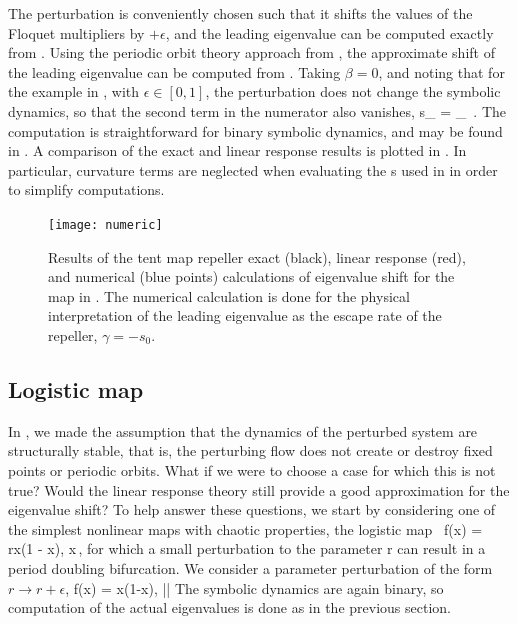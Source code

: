 \documentclass[aps,pre,
                showpacs,
                twocolumn,
                groupedaddress,
                superscriptaddress,
                floatfix]{revtex4-1}
\begin{document}
The perturbation is
conveniently chosen such that it shifts the values of the Floquet
multipliers by $+\epsilon$, and the leading eigenvalue can be computed
exactly from . Using the periodic orbit theory approach from
, the approximate shift of the leading
eigenvalue can be computed from . Taking $\beta=0$,
and noting that for the example in , with
$\epsilon\in [0,1]$, the perturbation does not change the symbolic
dynamics, so that the second term in the numerator also vanishes,
\beq
\delta s_{\alpha}
  = 
    _{\zeta}
\,.
\eeq
The computation is straightforward for binary symbolic dynamics, and may
be found in . A comparison of the exact
and linear response results is plotted in . In
particular, curvature terms are neglected when evaluating the {\cycForm
s} used in  in order to simplify computations.

\begin{figure}[htbp]
\texttt{[image: numeric]}
    \caption{\label{fig:numeric}
Results of the tent map repeller exact (black), linear response (red),
and numerical (blue points) calculations of eigenvalue shift for the map
in .
The numerical calculation is done for
the physical interpretation of the leading eigenvalue as the escape rate
of the repeller, $\gamma = -s_{0}$.
    }
\end{figure}

\subsection{Logistic map}
\label{sect:logstMap}

In , we made the assumption that the dynamics of the
perturbed system are structurally stable, that is, the perturbing flow
does not create or destroy fixed points or periodic orbits. What if we
were to choose a case for which this is not true? Would the linear
response theory still provide a good approximation for the eigenvalue
shift? To help answer these questions, we start by considering one of the
simplest nonlinear maps with chaotic properties, the logistic map\
\beq
f(x) = rx(1 - x), x\in [0, 1]
\,,
for which a small perturbation to the parameter r can result in a period
doubling bifurcation. We consider a parameter perturbation of the form
$r \to r+\epsilon$,
\beq
\epsilon \delta f(x) = \epsilon x(1-x), |\epsilon|
\eeq
The symbolic dynamics are again binary, so computation of the actual
eigenvalues is done as in the previous section.
\end{document}
